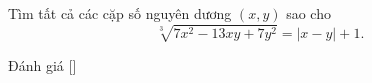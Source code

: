 \ifshowproblem
\begin{problem}\label{problem:GER-2015-TST-P4}
	Tìm tất cả các cặp số nguyên dương \((x, y)\) sao cho
	\[
		\sqrt[3]{7x^2 - 13xy + 7y^2} = |x - y| + 1.
	\]
\end{problem}
\fi

\ifshowinfo
Đánh giá [\textbf{}]\footnotemark
{}
\fi